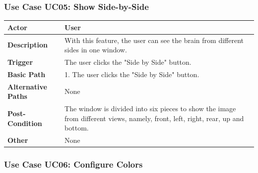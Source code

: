 \documentclass[paper=a4, fontsize=12pt]{scrartcl}	%
\numberwithin{equation}{section}		%
\numberwithin{figure}{section}			%
\numberwithin{table}{section}				%
\newcommand{\skipsubsection}[0]{\vspace{1cm}}
\begin{document}
    \subsubsection{Use Case UC05: Show Side-by-Side}
    \begin{center}
    \end{center}
    	\begin{center}
        	\begin{tabular}{ | p{4cm} | p{9cm} |}
            	\hline
                	\textbf{Actor} & User\\ \hline
                    \textbf{Description} & With this feature, the user can see the brain from different sides in one window.\\ \hline
                    \textbf{Trigger} & The user clicks the "Side by Side" button.\\ \hline
                    \textbf{Basic Path} & 1. The user clicks the "Side by Side" button.\\ \hline
                    \textbf{Alternative Paths} & None\\ \hline
                    \textbf{Post-Condition} & The window is divided into six pieces to show the image from different views, namely, front, left, right, rear, up and bottom.\\ \hline
                    \textbf{Other} & None\\
                \hline
            \end{tabular}
        \end{center}
    \skipsubsection
    
    \subsubsection{Use Case UC06: Configure Colors}
    \begin{center}
    \end{center}
    
\end{document}
